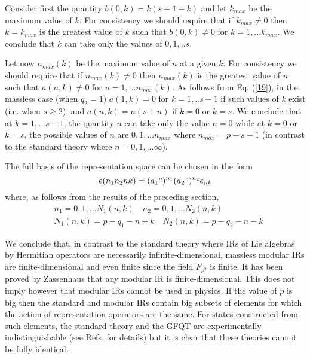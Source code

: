 \documentclass[a4paper,12pt]{article}%
\begin{document}
Consider first the quantity $b(0,k)=k(s+1-k)$ and let 
$k_{max}$ be the maximum value of $k$. For consistency
we should require that if $k_{max}\neq 0$ then $k=k_{max}$ is
the greatest value of $k$ such that $b(0,k) \neq 0$ for
$k=1,...k_{max}$. We conclude that $k$ can take only the 
values of $0,1,..s$. 

Let now $n_{max}(k)$ be the maximum value of $n$ at a given
$k$. For consistency we should require that if 
$n_{max}(k) \neq 0$ then $n_{max}(k)$ is the greatest value
of $n$ such that $a(n,k)\neq 0$ for $n=1,...n_{max}(k)$.
As follows from Eq. (\ref{19}), in the massless case
(when $q_2=1$) $a(1,k)=0$ for $k=1,..s-1$ if such values of
$k$ exist (i.e. when $s\geq 2$), and $a(n,k)=n(s+n)$ if
$k=0$ or $k=s$. We conclude that at $k=1,...s-1$, the
quantity $n$ can take only the value $n=0$ while at $k=0$
or $k=s$, the possible values of $n$ are $0,1,...n_{max}$
where $n_{max}=p-s-1$ (in contrast to the standard theory
where $n=0,1,...\infty$).

The full basis of the representation space can be chosen in the
form 
\begin{equation}
e(n_1n_2nk)=(a_1")^{n_1}(a_2")^{n_2}e_{nk} 
\label{20}
\end{equation}
where, as follows from the
results of the preceding section, 
\begin{eqnarray}
&n_1=0,1,...N_1(n,k)\quad n_2=0,1,...N_2(n,k)\nonumber\\
&N_1(n,k)=p-q_1-n+k\quad N_2(n,k)=p-q_2-n-k
\label{21}
\end{eqnarray}

We conclude that, in contrast to the standard theory
where IRs of Lie algebras by Hermitian operators are
necessarily infinite-dimensional, massless modular IRs
are finite-dimensional and even finite since the field
$F_{p^2}$ is finite. It has been proved by Zassenhaus
\cite{Zass} that any modular IR is 
finite-dimensional. This does not imply however that
modular IRs cannot be used in physics. If the value
of $p$ is big then the standard and modular IRs contain
big subsets of elements for which the action of 
representation operators are the same. For states
constructed from such elements, the standard theory
and the GFQT are experimentally indistinguishable 
(see Refs. \cite{lev1,lev2} for details) but it is
clear that these theories cannot be fully identical.
\end{document}
